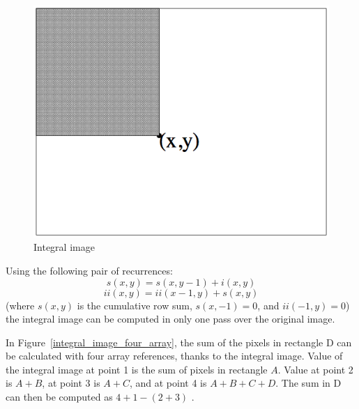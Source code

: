 \begin{figure}[!h]
\begin{center}
\noindent \includegraphics[scale=0.5]{figures/integral_image_description} 
\newline
\caption{Integral image}
\label{integral_image_description}
\end{center} 
\end{figure}
	
\noindent Using the following pair of recurrences: 
\begin{equation}
s(x,y) = s(x,y - 1) + i(x,y)
\end{equation}
\begin{equation}
ii(x,y) = ii(x - 1,y) + s(x,y)
\end{equation}
(where $ s(x,y) $ is the cumulative row sum, $ s(x,-1) = 0 $, and $ ii(-1,y) = 0 $) the integral image can be computed in only one pass over the original image. 
\newline

\noindent In Figure~\ref{integral_image_four_array}, the sum of the pixels in rectangle D can be calculated with four array references, thanks to the integral image. Value of the integral image at point 1 is the sum of pixels in rectangle $ A $. Value at point 2 is $ A + B $, at point 3 is $ A + C $, and at  point 4 is $ A + B + C + D $. The sum in D can then be computed as $ 4 + 1 - (2 + 3) $ \cite{VIO01}. 
\newline

